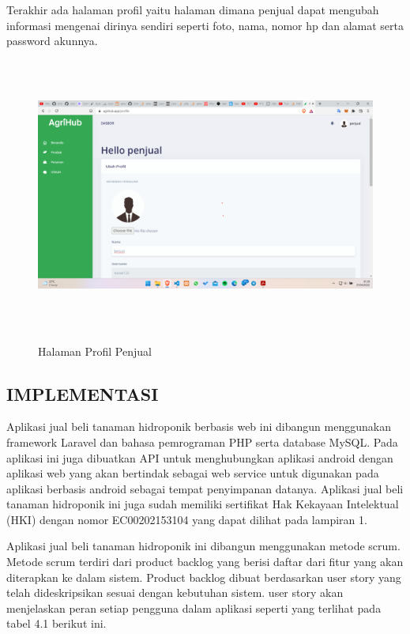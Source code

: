 \begin{enumerate}
\begin{enumerate}
			\par Terakhir ada halaman profil yaitu halaman dimana penjual dapat mengubah informasi mengenai dirinya sendiri seperti foto, nama, nomor hp dan alamat serta password akunnya.

			\begin{figure}[H]
				\centering
				{\includegraphics [width = 14.3cm, height= 9cm]{gambar/penjual/profil}}
				\caption{Halaman Profil Penjual}
				\label{profil}
			\end{figure}

		\end{enumerate}
\end{enumerate}

\subsection{\uppercase{Implementasi}}
Aplikasi jual beli tanaman hidroponik berbasis web ini dibangun
menggunakan framework Laravel dan bahasa pemrograman PHP serta database MySQL. Pada aplikasi ini juga dibuatkan API untuk menghubungkan aplikasi android dengan aplikasi web yang akan bertindak sebagai web service untuk digunakan pada aplikasi berbasis android sebagai tempat penyimpanan datanya. Aplikasi jual beli tanaman hidroponik ini juga sudah memiliki sertifikat Hak Kekayaan Intelektual (HKI) dengan nomor EC00202153104 yang dapat dilihat pada lampiran 1.

\par Aplikasi jual beli tanaman hidroponik ini dibangun menggunakan metode scrum. Metode scrum terdiri dari product backlog yang berisi daftar dari fitur yang akan diterapkan ke dalam sistem. Product backlog dibuat berdasarkan user story
yang telah dideskripsikan sesuai dengan kebutuhan sistem. user story akan menjelaskan peran setiap pengguna dalam aplikasi seperti yang terlihat pada tabel 4.1 berikut ini.

